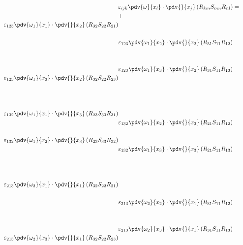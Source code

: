\begin{equation}
	\begin{split}
		 & \varepsilon_{ijk}\pdv{\omega}{x_{l}} \cdot\pdv{}{x_{j}}\left(R_{km}S_{mn}R_{nl}\right) =  \\ 
		&+		&		&\\ 
				\varepsilon_{123}\pdv{\omega_{1}}{x_{1}}\cdot\pdv{}{x_{2}}\left(R_{32}S_{22}R_{21}\right)
		\\ 
						\\ 
		&\varepsilon_{123}\pdv{\omega_{1}}{x_{2}}\cdot\pdv{}{x_{2}}\left(R_{31}S_{11}R_{12}\right)
		&		&\\ 
						\\ 
						\\ 
		&\varepsilon_{123}\pdv{\omega_{1}}{x_{3}}\cdot\pdv{}{x_{2}}\left(R_{31}S_{11}R_{13}\right)
		&		&\\ 
				\varepsilon_{123}\pdv{\omega_{1}}{x_{3}}\cdot\pdv{}{x_{2}}\left(R_{32}S_{22}R_{23}\right)
		\\ 
						\\ 
		&		&		&\\ 
						\\ 
						\varepsilon_{132}\pdv{\omega_{1}}{x_{1}}\cdot\pdv{}{x_{3}}\left(R_{23}S_{33}R_{31}\right)
\\ 
		&\varepsilon_{132}\pdv{\omega_{1}}{x_{2}}\cdot\pdv{}{x_{3}}\left(R_{21}S_{11}R_{12}\right)
		&		&\\ 
						\\ 
						\varepsilon_{132}\pdv{\omega_{1}}{x_{2}}\cdot\pdv{}{x_{3}}\left(R_{23}S_{33}R_{32}\right)
\\ 
		&\varepsilon_{132}\pdv{\omega_{1}}{x_{3}}\cdot\pdv{}{x_{3}}\left(R_{21}S_{11}R_{13}\right)
		&		&\\ 
						\\ 
						\\ 
		&		&		&\\ 
				\varepsilon_{213}\pdv{\omega_{2}}{x_{1}}\cdot\pdv{}{x_{1}}\left(R_{32}S_{22}R_{21}\right)
		\\ 
						\\ 
		&\varepsilon_{213}\pdv{\omega_{2}}{x_{2}}\cdot\pdv{}{x_{1}}\left(R_{31}S_{11}R_{12}\right)
		&		&\\ 
						\\ 
						\\ 
		&\varepsilon_{213}\pdv{\omega_{2}}{x_{3}}\cdot\pdv{}{x_{1}}\left(R_{31}S_{11}R_{13}\right)
		&		&\\ 
				\varepsilon_{213}\pdv{\omega_{2}}{x_{3}}\cdot\pdv{}{x_{1}}\left(R_{32}S_{22}R_{23}\right)

\end{split}
\end{equation}
